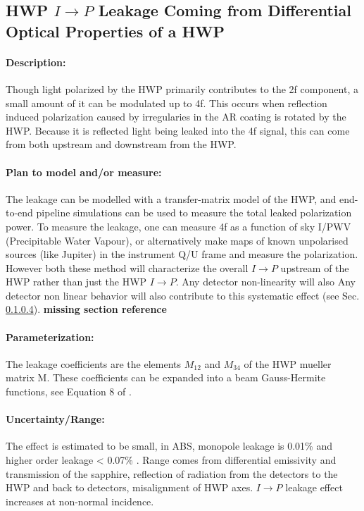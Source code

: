 \subsection{HWP $I \rightarrow P$ Leakage Coming from Differential Optical Properties of a HWP} 

\paragraph{Description:}
Though light polarized by the HWP primarily contributes to the 2f component, a small amount of it can be modulated 
up to 4f.
This occurs when reflection induced polarization caused by irregularies in the AR coating is rotated by the HWP\cite{Essinger-Hileman2013, Essinger-Hileman2016, ABS_HWP}. 
Because it is reflected light being leaked into the 4f signal, this can come from both upstream and downstream from the HWP.

\paragraph{Plan to model and/or measure:}
The leakage can be modelled with a transfer-matrix model of the HWP, and end-to-end pipeline simulations can be used to measure the total leaked polarization power.
To measure the leakage, one can measure 4f as a function of sky I/PWV (Precipitable Water Vapour), or alternatively make maps of known unpolarised sources (like Jupiter) in the instrument Q/U frame
and measure the polarization. However both these method will characterize the overall $I \rightarrow P$ upstream of the HWP rather than just the HWP $I \rightarrow P$.
Any detector non-linearity will also Any detector non linear behavior will also contribute to this systematic effect (see Sec. \ref{}). \textbf{missing section reference}


\paragraph{Parameterization:}
The leakage coefficients are the elements $M_{12}$ and $M_{34}$ of the HWP mueller matrix M. These coefficients can be expanded into a beam Gauss-Hermite functions, 
see Equation 8 of \cite{Essinger-Hileman2016}. 

\paragraph{Uncertainty/Range:}
The effect is estimated to be small, in ABS, monopole leakage is 0.01\% and higher order leakage < 0.07\% \cite{Essinger-Hileman2016}.
Range comes from differential emissivity and transmission of the sapphire, reflection of radiation from the detectors to the HWP and back to detectors, 
misalignment of HWP axes. $I \rightarrow P$ leakage effect increases at non-normal incidence.
